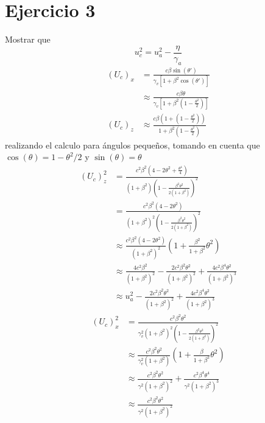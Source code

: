 \section*{Ejercicio 3}
Mostrar que
    \begin{equation}
        u_c^2 = u_a^2 - \frac{\eta}{\gamma_a}
    \end{equation}
    \begin{align*}
        (U_c)_x &= \frac{c\beta \sin({\theta}')}{\gamma_v \left[1+\beta^2 \cos({\theta}') \right]}\\
        & \approx \frac{c \beta  \theta}{\gamma_v \left[1+\beta^2 \left(1- \frac{\theta^2}{2} \right) \right]}\\
        (U_c)_z & \approx \frac{c \beta (1+\left(1-\frac{\theta^2}{2} \right))}{1+\beta^2\left(1-\frac{\theta^2}{2}\right)}
    \end{align*}
    realizando el calculo para ángulos pequeños, tomando en cuenta que $\cos(\theta)=1-\theta^2/2$ y $\sin(\theta)=\theta$
    \begin{align*}
        (U_c)_z^2 &= \frac{c^2 \beta^2 \left(4-2\theta^2+\frac{\theta^4}{4}\right)}{(1+\beta^2)\left(1- \frac{\beta^2 \theta^2}{2(1+\beta^2)}\right)^2}\\
        & = \frac{c^2 \beta^2 (4-2\theta^2)}{(1+\beta^2)^2 \left(1- \frac{\beta^2 \theta^2 }{2(1+\beta^2)}\right)^2}\\
        & \approx \frac{c^2 \beta^2 (4-2\theta^2)}{(1+\beta^2)^2} \left(1+ \frac{\beta^2}{1+\beta^2}\theta^2 \right)\\
        & \approx \frac{4c^2 \beta^2}{(1+\beta^2)^2} - \frac{2c^2 \beta^2 \theta^2}{(1+\beta^2)^2} + \frac{4c^2 \beta^4 \theta^2}{(1+\beta^2)^3}\\
        & \approx u_a^2 - \frac{2c^2 \beta^2 \theta^2}{(1+\beta^2)^2} + \frac{4c^2 \beta^4 \theta^2}{(1+\beta^2)^3} 
    \end{align*}
    \begin{align*}
        (U_c)_x^2 &= \frac{c^2 \beta^2 \theta^2}{\gamma_v^2 (1+\beta^2)^2 \left(1-\frac{\beta^2 \theta^2}{2(1+\beta^2)} \right)^2}\\
        &\approx \frac{c^2 \beta^2 \theta^2 }{\gamma^2_v (1+\beta^2)} \left(1+\frac{\beta}{1+\beta^2}\theta^2 \right)\\
        &\approx \frac{c^2 \beta^2 \theta^2}{\gamma^2 (1+\beta^2)^2} + \frac{c^2 \beta^4 \theta^4}{\gamma^2 (1+\beta^2)^3}\\
        &\approx \frac{c^2 \beta^2 \theta^2}{\gamma^2 (1+\beta^2)^2}
    \end{align*}
